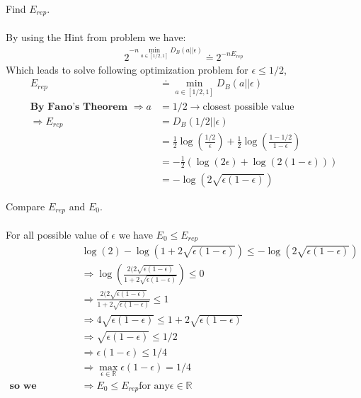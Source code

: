 \documentclass[
  course = {{EE623 Information Theory}},
  quartile = {{4}},
  assignment = 8,
  name = {{Mohammad Mahdi Rahimi}},
  studentnumber = {{20208244}},
  email = {{mahi@kaist.ac.kr}},
  firstexercise = 1
]{aga-homework}
\begin{document}
\exercise
\subexercise Find $E_{rep}$.
\\\\
By using the Hint from problem we have:
\begin{equation} \label{eq1}
\begin{split}
2^{-n\min_{a \in [1/2, 1]} D_B(a||\epsilon)} \doteq 2^{-nE_{rep}}
\end{split}
\end{equation}
Which leads to solve following optimization problem for $\epsilon \le 1/2$, 
\begin{equation} \label{eq2}
\begin{split}
E_{rep} & \doteq \min_{a \in [1/2, 1]} D_B(a||\epsilon)\\
\textbf{By Fano's Theorem } \Rightarrow a & = 1/2 \rightarrow \text{closest possible value}\\
\Rightarrow E_{rep} & = D_B(1/2||\epsilon) \\
& = \frac{1}{2}\log{(\frac{1/2}{\epsilon})} + \frac{1}{2}\log{(\frac{1 - 1/2}{1 - \epsilon})}\\
& = -\frac{1}{2}(\log{(2\epsilon)} + \log{(2(1 - \epsilon))})\\
& = -\log{(2\sqrt{\epsilon(1 - \epsilon)})}
\end{split}
\end{equation}

\subexercise Compare $E_{rep}$ and $E_0$.
\\\\
For all possible value of $\epsilon$ we have $E_{0} \le E_{rep}$
\begin{equation} \label{eq3}
\begin{split}
&\log{(2)} - \log(1 + 2\sqrt{\epsilon(1 - \epsilon)}) \le -\log{(2\sqrt{\epsilon(1 - \epsilon)})}\\
& \Rightarrow \log(\frac{2(2\sqrt{\epsilon(1 - \epsilon)}}{1 + 2\sqrt{\epsilon(1 - \epsilon)}}) \le 0\\
& \Rightarrow \frac{2(2\sqrt{\epsilon(1 - \epsilon)}}{1 + 2\sqrt{\epsilon(1 - \epsilon)}} \le 1 \\
& \Rightarrow 4\sqrt{\epsilon(1 - \epsilon)} \le 1 + 2\sqrt{\epsilon(1 - \epsilon)} \\
& \Rightarrow \sqrt{\epsilon(1 - \epsilon)} \le 1/2 \\
& \Rightarrow \epsilon(1 - \epsilon) \le 1/4 \\
& \Rightarrow \max_{\epsilon \in \mathbb{R}}\epsilon(1 - \epsilon) = 1/4 \\
\textbf{so we proved}& \Rightarrow E_{0} \le E_{rep} \text{for any} \epsilon \in \mathbb{R}
\end{split}
\end{equation}
\end{document}
